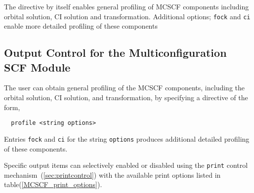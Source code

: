 
The directive by itself enables general profiling of MCSCF components
including orbital solution, CI solution and transformation. Additional
options; \verb+fock+ and \verb+ci+ enable more detailed profiling of
these components

\subsection{Output Control for the Multiconfiguration SCF Module}

The user can obtain general profiling of the MCSCF components, including
the orbital solution, CI solution, and transformation, by specifying a
directive of the form,

\begin{verbatim}
  profile <string options>
\end{verbatim}

Entries \verb+fock+ and \verb+ci+ for the string \verb+options+ produces
additional detailed profiling of these components.




Specific output items can selectively enabled or disabled using the
\verb+print+ control mechanism~(\ref{sec:printcontrol}) with the
available print options listed in table(\ref{MCSCF_print_options}).

